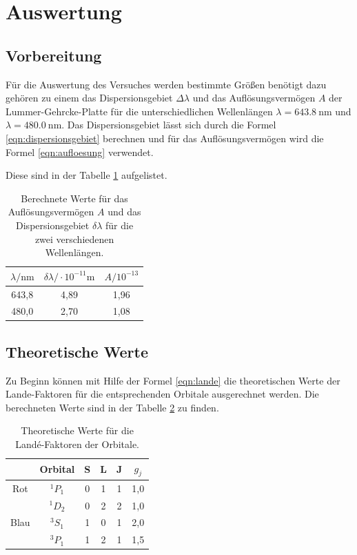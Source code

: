 \section{Auswertung}
\label{sec:Auswertung}
\subsection{Vorbereitung}
Für die Auswertung des Versuches
werden bestimmte Größen benötigt dazu gehören
zu einem das Dispersionsgebiet $\Delta\lambda$
und das Auflösungsvermögen $A$ der Lummer-Gehrcke-Platte
für die unterschiedlichen Wellenlängen $\lambda=\SI{643.8}{\nano\meter}$
und $\lambda=\SI{480.0}{\nano\meter}$.
Das Dispersionsgebiet lässt sich durch die Formel \eqref{eqn:dispersionsgebiet} berechnen
und für das Auflösungsvermögen wird die Formel \eqref{eqn:aufloesung} verwendet.


Diese sind in der Tabelle  \ref{tab:vorbereitung} aufgelistet.
\begin{table}
  \centering
  \caption{Berechnete Werte für das Auflösungsvermögen $A$
  und das Dispersionsgebiet
   $\delta\lambda$ für die zwei verschiedenen Wellenlängen.}
  \label{tab:vorbereitung}
  \begin{tabular}{c c c}
    \toprule
       $\lambda / \si{\nano\meter} $ &  $\delta\lambda/ \cdot10^{-11}\si{\meter}$  & $A / 10^{-13}$\\
     \midrule
    643,8  &  4,89 &  1,96 \\
    480,0  &  2,70 &  1,08 \\
    \bottomrule
  \end{tabular}
\end{table}



\FloatBarrier

\subsection{Theoretische Werte}
Zu Beginn können mit Hilfe der Formel \eqref{eqn:lande}
die theoretischen Werte der Lande-Faktoren
für die entsprechenden Orbitale ausgerechnet werden.
Die berechneten Werte sind in der Tabelle \ref{tab:theo1}
zu finden.

\begin{table}
  \centering
  \caption{Theoretische Werte für die Landé-Faktoren der Orbitale.}
  \label{tab:theo1}
  \begin{tabular}{c c c c c c}
    \toprule
& Orbital  & S   &  L & J  & $g_j$ \\
    \midrule
Rot & $^1P_1$ & 0 & 1 & 1 & 1,0\\
&$^1D_2$& 0 & 2 & 2 & 1,0\\
Blau&$^3S_1$& 1 & 0 & 1 & 2,0\\
&$^3P_1$& 1 & 2 & 1 & 1,5\\
    \bottomrule
  \end{tabular}
\end{table}

